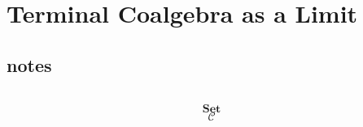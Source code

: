 \documentclass[DaoFP]{subfiles}
\begin{document}
\section{Terminal Coalgebra as a Limit}


\subsection{notes}


\begin{exercise}
\end{exercise}

\begin{haskell}
\end{haskell}

\[
 \begin{tikzcd}
  \end{tikzcd}
\]

\[   \mathbf{Set} \]
\[   \mathcal{C} \]
\end{document}
